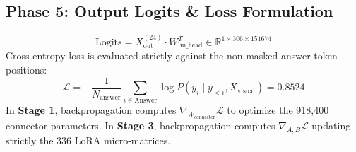 \documentclass[11pt, a4paper]{article}
\begin{document}
\subsection{Phase 5: Output Logits \& Loss Formulation}
\begin{equation}
    \text{Logits} = X_{\text{out}}^{(24)} \cdot W_{\text{lm\_head}}^T \in \mathbb{R}^{1 \times 306 \times 151674}
\end{equation}
Cross-entropy loss is evaluated strictly against the non-masked answer token positions:
\begin{equation}
    \mathcal{L} = -\frac{1}{N_{\text{answer}}} \sum_{i \in \text{Answer}} \log P(y_i \mid y_{<i}, X_{\text{visual}}) = 0.8524
\end{equation}
In \textbf{Stage 1}, backpropagation computes $\nabla_{W_{\text{connector}}} \mathcal{L}$ to optimize the 918,400 connector parameters. In \textbf{Stage 3}, backpropagation computes $\nabla_{A, B} \mathcal{L}$ updating strictly the 336 LoRA micro-matrices.
\end{document}
